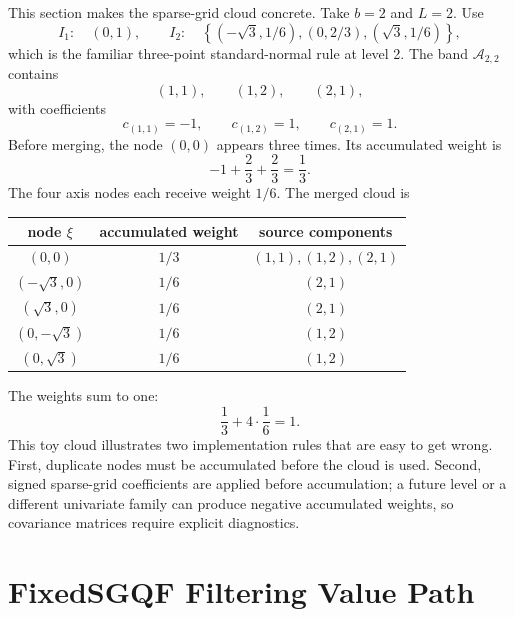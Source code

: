 \documentclass[11pt]{article}
\numberwithin{equation}{section}
\begin{document}
This section makes the sparse-grid cloud concrete.  Take \(b=2\) and \(L=2\).
Use
\begin{equation}
  I_1:\quad (0,1),
  \qquad
  I_2:\quad
  \left\{(-\sqrt3,1/6),(0,2/3),(\sqrt3,1/6)\right\},
  \label{eq:p31-toy-univariate}
\end{equation}
which is the familiar three-point standard-normal rule at level 2.  The band
\(\mathcal A_{2,2}\) contains
\begin{equation}
  (1,1),\qquad (1,2),\qquad (2,1),
  \label{eq:p31-toy-indices}
\end{equation}
with coefficients
\begin{equation}
  c_{(1,1)}=-1,\qquad c_{(1,2)}=1,\qquad c_{(2,1)}=1.
  \label{eq:p31-toy-coefficients}
\end{equation}
Before merging, the node \((0,0)\) appears three times.  Its accumulated weight
is
\begin{equation}
  -1+\frac23+\frac23=\frac13.
  \label{eq:p31-toy-origin-weight}
\end{equation}
The four axis nodes each receive weight \(1/6\).  The merged cloud is
\begin{center}
\begin{tabular}{ccc}
\toprule
node \(\xi\) & accumulated weight & source components \\
\midrule
\((0,0)\) & \(1/3\) & \((1,1),(1,2),(2,1)\) \\
\((-\sqrt3,0)\) & \(1/6\) & \((2,1)\) \\
\((\sqrt3,0)\) & \(1/6\) & \((2,1)\) \\
\((0,-\sqrt3)\) & \(1/6\) & \((1,2)\) \\
\((0,\sqrt3)\) & \(1/6\) & \((1,2)\) \\
\bottomrule
\end{tabular}
\end{center}
The weights sum to one:
\begin{equation}
  \frac13+4\cdot\frac16=1.
  \label{eq:p31-toy-weight-total}
\end{equation}
This toy cloud illustrates two implementation rules that are easy to get
wrong.  First, duplicate nodes must be accumulated before the cloud is used.
Second, signed sparse-grid coefficients are applied before accumulation; a
future level or a different univariate family can produce negative accumulated
weights, so covariance matrices require explicit diagnostics.

\section{FixedSGQF Filtering Value Path}
\label{sec:p31-value-path}
\end{document}
